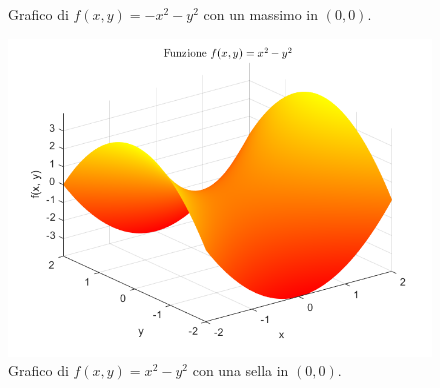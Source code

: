 \begin{example}
\begin{figure}[H]
\begin{minipage}{0.26\textwidth}
            \caption{Grafico di $f(x,y)=-x^2-y^2$ con un massimo in $(0,0)$.}
        \end{minipage}
        \hspace{1cm}
        \begin{minipage}{0.26\textwidth}
            \centering
            \includegraphics[width=\textwidth]{Capitoli/Capitolo2/B_Punti critici 3.png}
            \caption{Grafico di $f(x,y)={x^2}-{y^2}$ con una sella in $(0,0)$.}
        \end{minipage}
    \end{figure}
\end{example}
